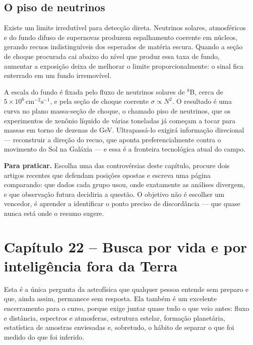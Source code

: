 \documentclass[11pt,a4paper]{article}
\begin{document}
\subsection*{O piso de neutrinos}

Existe um limite irredutível para detecção direta. Neutrinos solares, atmosféricos e do fundo difuso de supernovas produzem espalhamento coerente em núcleos, gerando recuos indistinguíveis dos esperados de matéria escura. Quando a seção de choque procurada cai abaixo do nível que produz essa taxa de fundo, aumentar a exposição deixa de melhorar o limite proporcionalmente: o sinal fica enterrado em um fundo irremovível.

A escala do fundo é fixada pelo fluxo de neutrinos solares de $^{8}$B, cerca de $5\times10^{6}\,\mathrm{cm^{-2}s^{-1}}$, e pela seção de choque coerente $\sigma\propto N^{2}$. O resultado é uma curva no plano massa-seção de choque, o chamado piso de neutrinos, que os experimentos de xenônio líquido de várias toneladas já começam a tocar para massas em torno de dezenas de GeV. Ultrapassá-lo exigirá informação direcional --- reconstruir a direção do recuo, que aponta preferencialmente contra o movimento do Sol na Galáxia --- e essa é a fronteira tecnológica atual do campo.

\textbf{Para praticar.} Escolha uma das controvérsias deste capítulo, procure dois artigos recentes que defendam posições opostas e escreva uma página comparando: que dados cada grupo usou, onde exatamente as análises divergem, e que observação futura decidiria a questão. O objetivo não é escolher um vencedor, é aprender a identificar o ponto preciso de discordância --- que quase nunca está onde o resumo sugere.


\newpage
\section*{Capítulo 22 -- Busca por vida e por inteligência fora da Terra}
Esta é a única pergunta da astrofísica que qualquer pessoa entende sem preparo e que, ainda assim, permanece sem resposta. Ela também é um excelente encerramento para o curso, porque exige juntar quase tudo o que veio antes: fluxo e distância, espectros e atmosferas, estrutura estelar, formação planetária, estatística de amostras enviesadas e, sobretudo, o hábito de separar o que foi medido do que foi inferido.
\end{document}
